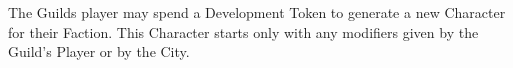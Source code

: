 The Guilds player may spend a Development Token to generate a new Character for their Faction. This Character starts only with any modifiers given by the Guild’s Player or by the City. 
